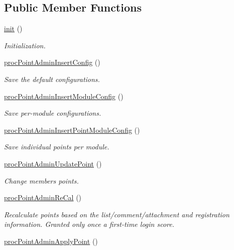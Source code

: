 \subsection*{Public Member Functions}
\begin{DoxyCompactItemize}
\item 
\hyperlink{classpointAdminController_a739b139aeeef70cf164f5e21dccec06a}{init} ()
\begin{DoxyCompactList}\small\item\em Initialization. \end{DoxyCompactList}\item 
\hyperlink{classpointAdminController_a57b75694a363d0c8dc6d46ffce1ce25d}{proc\+Point\+Admin\+Insert\+Config} ()
\begin{DoxyCompactList}\small\item\em Save the default configurations. \end{DoxyCompactList}\item 
\hyperlink{classpointAdminController_a8358535932ea77e28e3510b4f42d1083}{proc\+Point\+Admin\+Insert\+Module\+Config} ()
\begin{DoxyCompactList}\small\item\em Save per-\/module configurations. \end{DoxyCompactList}\item 
\hyperlink{classpointAdminController_a54aeea5eae9769da55bd85159a41501a}{proc\+Point\+Admin\+Insert\+Point\+Module\+Config} ()
\begin{DoxyCompactList}\small\item\em Save individual points per module. \end{DoxyCompactList}\item 
\hyperlink{classpointAdminController_a2d90c166719dee56dbee47b7aa5eb30d}{proc\+Point\+Admin\+Update\+Point} ()
\begin{DoxyCompactList}\small\item\em Change members points. \end{DoxyCompactList}\item 
\hyperlink{classpointAdminController_a0932223bc8b3441dcfff013c6050ee89}{proc\+Point\+Admin\+Re\+Cal} ()
\begin{DoxyCompactList}\small\item\em Recalculate points based on the list/comment/attachment and registration information. Granted only once a first-\/time login score. \end{DoxyCompactList}\item 
\hyperlink{classpointAdminController_ade85d4289b954ca0c0caadafeb4c115c}{proc\+Point\+Admin\+Apply\+Point} ()

\end{DoxyCompactItemize}
